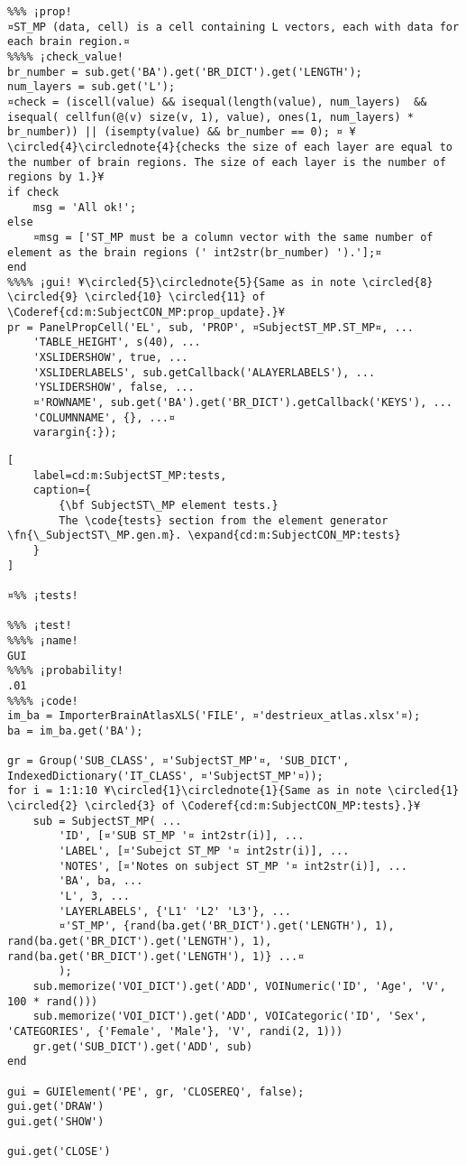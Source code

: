 \documentclass{tufte-handout}
\begin{document}
\begin{lstlisting}
%%% ¡prop!
¤ST_MP (data, cell) is a cell containing L vectors, each with data for each brain region.¤
%%%% ¡check_value!
br_number = sub.get('BA').get('BR_DICT').get('LENGTH');
num_layers = sub.get('L');
¤check = (iscell(value) && isequal(length(value), num_layers)  && isequal( cellfun(@(v) size(v, 1), value), ones(1, num_layers) * br_number)) || (isempty(value) && br_number == 0); ¤ ¥\circled{4}\circlednote{4}{checks the size of each layer are equal to the number of brain regions. The size of each layer is the number of regions by 1.}¥
if check
    msg = 'All ok!';
else   
    ¤msg = ['ST_MP must be a column vector with the same number of element as the brain regions (' int2str(br_number) ').'];¤
end
%%%% ¡gui! ¥\circled{5}\circlednote{5}{Same as in note \circled{8} \circled{9} \circled{10} \circled{11} of \Coderef{cd:m:SubjectCON_MP:prop_update}.}¥
pr = PanelPropCell('EL', sub, 'PROP', ¤SubjectST_MP.ST_MP¤, ...
    'TABLE_HEIGHT', s(40), ...
    'XSLIDERSHOW', true, ...
    'XSLIDERLABELS', sub.getCallback('ALAYERLABELS'), ...
    'YSLIDERSHOW', false, ...
    ¤'ROWNAME', sub.get('BA').get('BR_DICT').getCallback('KEYS'), ...
    'COLUMNNAME', {}, ...¤
    varargin{:});

\end{lstlisting}

\begin{lstlisting}[
	label=cd:m:SubjectST_MP:tests,
	caption={
		{\bf SubjectST\_MP element tests.}
		The \code{tests} section from the element generator \fn{\_SubjectST\_MP.gen.m}. \expand{cd:m:SubjectCON_MP:tests}
	}
]

¤%% ¡tests!

%%% ¡test!
%%%% ¡name!
GUI
%%%% ¡probability!
.01
%%%% ¡code!
im_ba = ImporterBrainAtlasXLS('FILE', ¤'destrieux_atlas.xlsx'¤);
ba = im_ba.get('BA');

gr = Group('SUB_CLASS', ¤'SubjectST_MP'¤, 'SUB_DICT', IndexedDictionary('IT_CLASS', ¤'SubjectST_MP'¤));
for i = 1:1:10 ¥\circled{1}\circlednote{1}{Same as in note \circled{1} \circled{2} \circled{3} of \Coderef{cd:m:SubjectCON_MP:tests}.}¥
    sub = SubjectST_MP( ...
        'ID', [¤'SUB ST_MP '¤ int2str(i)], ...
        'LABEL', [¤'Subejct ST_MP '¤ int2str(i)], ...
        'NOTES', [¤'Notes on subject ST_MP '¤ int2str(i)], ...
        'BA', ba, ...
        'L', 3, ...
        'LAYERLABELS', {'L1' 'L2' 'L3'}, ...
        ¤'ST_MP', {rand(ba.get('BR_DICT').get('LENGTH'), 1), rand(ba.get('BR_DICT').get('LENGTH'), 1), rand(ba.get('BR_DICT').get('LENGTH'), 1)} ...¤
        );
    sub.memorize('VOI_DICT').get('ADD', VOINumeric('ID', 'Age', 'V', 100 * rand()))
    sub.memorize('VOI_DICT').get('ADD', VOICategoric('ID', 'Sex', 'CATEGORIES', {'Female', 'Male'}, 'V', randi(2, 1)))
    gr.get('SUB_DICT').get('ADD', sub)
end

gui = GUIElement('PE', gr, 'CLOSEREQ', false);
gui.get('DRAW')
gui.get('SHOW')

gui.get('CLOSE')
\end{lstlisting}
\end{document}
